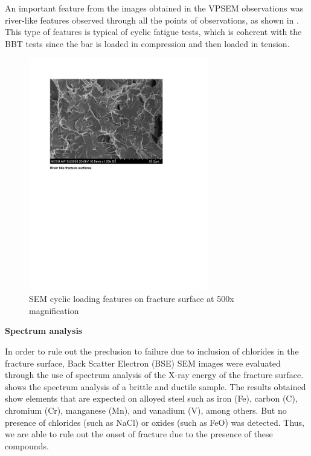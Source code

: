 An important feature from the images obtained in the VPSEM observations was river-like features observed through all the points of observations, as shown in . This type of features is typical of cyclic fatigue tests, which is coherent with the BBT tests since the bar is loaded in compression and then loaded in tension. %

\begin{figure}[htbp]
	\centering
	\includegraphics[width=0.7\textwidth]{VAC Thesis 2.0/Chapter-4/figs/BBT_RiverFeatures.pdf}
	\caption{SEM cyclic loading features on fracture surface at 500x magnification}
	\label{fig:RiverFeatures}
\end{figure}

\newpage
\textbf{Spectrum analysis}

In order to rule out the preclusion to failure due to inclusion of chlorides in the fracture surface, Back Scatter Electron (BSE) SEM images were evaluated through the use of spectrum analysis of the X-ray energy of the fracture surface.  shows the spectrum analysis of a brittle and ductile sample. The results obtained show elements that are expected on alloyed steel such as iron (Fe), carbon (C), chromium (Cr), manganese (Mn), and vanadium (V), among others. But no presence of chlorides (such as NaCl) or oxides (such as FeO) was detected. Thus, we are able to rule out the onset of fracture due to the presence of these compounds.

